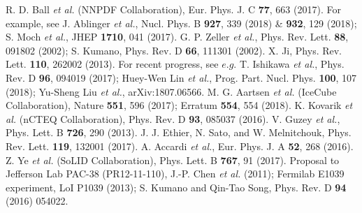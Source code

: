 \documentclass{PoS}
\begin{document}
\begin{thebibliography}{99}
\vspace{-0.20cm}
 R. D. Ball {\it et al.} (NNPDF Collaboration),
                       Eur. Phys. J. C {\bf 77}, 663 (2017).
\vspace{-0.20cm}
 For example, see 
                J. Ablinger {\it et al.}, Nucl. Phys. B {\bf 927}, 339 (2018)
                           \& {\bf 932}, 129 (2018);
                S. Moch {\it et al.}, JHEP {\bf 1710}, 041 (2017).
\vspace{-0.20cm}
 G. P. Zeller {\it et al.},
                   Phys. Rev. Lett. {\bf 88}, 091802 (2002);
                   S. Kumano, Phys. Rev. D {\bf 66}, 111301 (2002).
\vspace{-0.20cm}
 X. Ji, Phys. Rev. Lett. {\bf 110}, 262002 (2013).
    For recent progress, 
    see $e.g.$ T. Ishikawa {\it et al.}, Phys. Rev. D {\bf 96}, 094019 (2017);
    Huey-Wen Lin {\it et al.}, Prog. Part. Nucl. Phys. {\bf 100}, 107 (2018);
    Yu-Sheng Liu {\it et al.}, arXiv:1807.06566.
\vspace{-0.20cm}
 M. G. Aartsen {\it et al.} (IceCube Collaboration), 
                  Nature {\bf 551}, 596 (2017); Erratum {\bf 554}, 554 (2018).
\vspace{-0.20cm}
 K. Kovarik {\it et al.} (nCTEQ Collaboration),
                               Phys. Rev. D {\bf 93}, 085037 (2016).
\vspace{-0.20cm}
 V. Guzey {\it et al.}, 
                               Phys. Lett. B {\bf 726}, 290 (2013).
\vspace{-0.20cm}
 J. J. Ethier, N. Sato, and W. Melnitchouk,
                          Phys. Rev. Lett. {\bf 119}, 132001 (2017).
\vspace{-0.20cm}
 A. Accardi {\it et al.}, 
                          Eur. Phys. J. A {\bf 52}, 268 (2016).
\vspace{-0.20cm}
 Z. Ye {\it et al.} (SoLID Collaboration), 
                          Phys. Lett. B {\bf 767}, 91 (2017).
\vspace{-0.20cm}
 Proposal to Jefferson Lab PAC-38 (PR12-11-110), 
                         J.-P. Chen {\it et al.} (2011);
      Fermilab E1039 experiment, LoI P1039 (2013);
      S. Kumano and Qin-Tao Song, Phys. Rev. D {\bf 94} (2016) 054022. 

\end{thebibliography}
\end{document}
